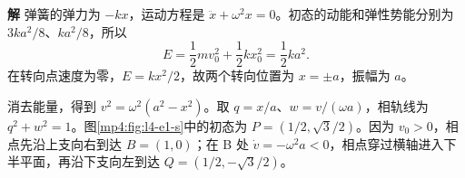 \documentclass[11pt,openany,fontset=fandol]{ctexbook}
\theoremstyle{definition}\newtheorem{example}{例}[chapter]\newtheorem{exercise}{习题}[chapter]
\newcommand{\SolutionStart}{\par\medskip\ifdim\pagetotal>0pt\ifdim\dimexpr\pagegoal-\pagetotal\relax<3\baselineskip\newpage\fi\fi\noindent\textbf{解}\quad\ignorespaces}
\newenvironment{solution}{\SolutionStart}{\par\medskip}
\begin{document}
\begin{solution}
弹簧的弹力为 $-kx$，运动方程是 $\ddot x+\omega^2x=0$。初态的动能和弹性势能分别为 $3ka^2/8$、$ka^2/8$，所以
\[
E=\frac12mv_0^2+\frac12kx_0^2=\frac12ka^2.
\]
在转向点速度为零，$E=kx^2/2$，故两个转向位置为 $x=\pm a$，振幅为 $a$。

消去能量，得到 $v^2=\omega^2(a^2-x^2)$。取 $q=x/a$、$w=v/(\omega a)$，相轨线为 $q^2+w^2=1$。图\ref{mp4:fig:l4-e1-s}中的初态为 $P=(1/2,\sqrt3/2)$。因为 $v_0>0$，相点先沿上支向右到达 $B=(1,0)$；在 B 处 $\dot v=-\omega^2a<0$，相点穿过横轴进入下半平面，再沿下支向左到达 $Q=(1/2,-\sqrt3/2)$。

\begin{figure}[H]\centering
{}
\end{figure}
\end{solution}
\end{document}
